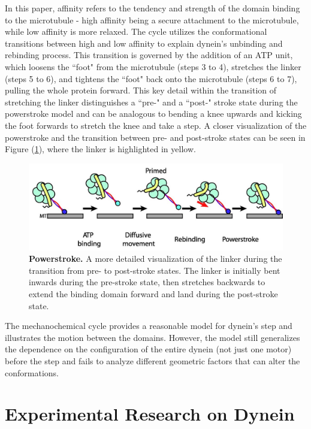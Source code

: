 In this paper, affinity refers to the tendency and strength of the domain binding to the microtubule - high affinity being a secure attachment to the microtubule, while low affinity is more relaxed. The cycle utilizes the conformational transitions between high and low affinity to explain dynein's unbinding and rebinding process. This transition is governed by the addition of an ATP unit, which loosens the ``foot" from the microtubule (steps 3 to 4), stretches the linker (steps 5 to 6), and tightens the ``foot" back onto the microtubule (steps 6 to 7), pulling the whole protein forward. This key detail within the transition of stretching the linker distinguishes a ``pre-" and a ``post-" stroke state during the powerstroke model and can be analogous to bending a knee upwards and kicking the foot forwards to stretch the knee and take a step. A closer visualization of the powerstroke and the transition between pre- and post-stroke states can be seen in Figure (\ref{fig:Powerstroke}), where the linker is highlighted in yellow.  

\begin{figure}[H]
	\centering
	\includegraphics[width=1\columnwidth]{Figures/powerstroke.jpeg}
	\caption[Powerstroke]{\textbf{Powerstroke.} A more detailed visualization of the linker during the transition from pre- to post-stroke states. The linker is initially bent inwards during the pre-stroke state, then stretches backwards to extend the binding domain forward and land during the post-stroke state. \cite{Carter2010communication} }
	\label{fig:Powerstroke}
\end{figure}

The mechanochemical cycle provides a reasonable model for dynein's step and illustrates the motion between the domains. However, the model still generalizes the dependence on the configuration of the entire dynein (not just one motor) before the step and fails to analyze different geometric factors that can alter the conformations.

\section{Experimental Research on Dynein}

